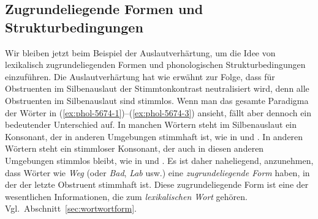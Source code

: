 \subsection{Zugrundeliegende Formen und Strukturbedingungen}
\label{sec:pholfeat}
\label{sec:ur}

Wir bleiben jetzt beim Beispiel der Auslautverhärtung, um die Idee von lexikalisch zugrundeliegenden Formen und phonologischen Strukturbedingungen einzuführen.
Die Auslautverhärtung hat wie erwähnt zur Folge, dass für Obstruenten im Silbenauslaut der Stimmtonkontrast neutralisiert wird, denn alle Obstruenten im Silbenauslaut sind stimmlos.
Wenn man das gesamte Paradigma der Wörter in (\ref{ex:phol-5674-1})--(\ref{ex:phol-5674-3}) ansieht, fällt aber dennoch ein bedeutender Unterschied auf.
In manchen Wörtern steht im Silbenauslaut ein Konsonant, der in anderen Umgebungen stimmhaft ist, wie in \textipa{[ve:k]} und \textipa{[ve:g@s]}.
In anderen Wörtern steht ein stimmloser Konsonant, der auch in diesen anderen Umgebungen stimmlos bleibt, wie in \textipa{[bOk]} und \textipa{[bOk@s]}.
Es ist daher naheliegend, anzunehmen, dass Wörter wie \textit{Weg} (oder \textit{Bad}, \textit{Lab} usw.) eine \textit{zugrundeliegende Form} haben, in der der letzte Obstruent stimmhaft ist.
Diese zugrundeliegende Form ist eine der wesentlichen Informationen, die zum \textit{lexikalischen Wort} gehören.
Vgl.\ Abschnitt~\ref{sec:wortwortform}.

